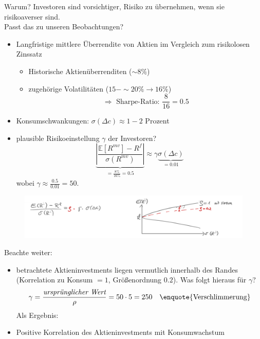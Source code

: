 \documentclass[12pt]{extreport} %
\theoremstyle{named}
\theoremstyle{nnamed}
\theoremstyle{itshape}
\theoremstyle{normal}
\begin{document}
Warum? Investoren sind vorsichtiger, Risiko zu übernehmen, wenn sie risikoaverser sind. ~\\

Passt das zu unseren Beobachtungen?
\begin{itemize}
	\item Langfristige mittlere Überrendite von Aktien im Vergleich zum risikolosen Zinssatz
		\begin{itemize}
			\item Historische Aktienüberrenditen ($\sim 8\%$)
			\item zugehörige Volatilitäten ($15 - \sim 20\% \rightarrow 16\%$) 
				$$ \Rightarrow \text{ Sharpe-Ratio: } \frac{8}{16} = 0.5 $$
		\end{itemize}
	\item Konsumschwankungen: $\sigma(\Delta c) \approx 1 - 2$ Prozent
	\item plausible Risikoeinstellung $\gamma$ der Investoren?
		$$ \underbrace{\left| \frac{\mathbb{E}\left[ R^{mv} \right] - R^f}{\sigma(R^{mv})} \right|}_{= \frac{8\%}{16\%} = 0.5} \approx \gamma \underbrace{ \sigma(\Delta c)}_{= 0.01} $$
		wobei $\gamma \approx \frac{0.5}{0.01} = 50$.
\end{itemize}

\begin{figure}[h!] \centering
	\includegraphics[scale=0.4]{img/p58}
\end{figure}

Beachte weiter:

\begin{itemize}
	\item betrachtete Aktieninvestments liegen vermutlich innerhalb des Randes (Korrelation zu Konsum $= 1$, Größenordnung $0.2$). Was folgt hieraus für $\gamma$?
		$$	\gamma = \frac{\textit{ursprünglicher Wert}}{\rho} = 50 \cdot 5 = 250 \quad \text{\enquote{Verschlimmerung}}  $$
		Als Ergebnis:
	\item Positive Korrelation des Aktieninvestments mit Konsumwachstum
\end{itemize}
\end{document}

